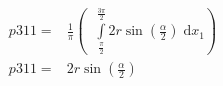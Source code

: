 \begin{align}
    p311 =&\frac{1}{\pi} \left(\;\;\int\limits_{\frac{\pi}{2}}^{\frac{3 \pi}{2}}2 r \sin{\left (\frac{\alpha}{2} \right )}\;\mathrm{d}x_{1}\right)\label{p311Def}\\
    p311 =& 2 r \sin{\left (\frac{\alpha}{2} \right )}\label{p311Sln}
\end{align}
